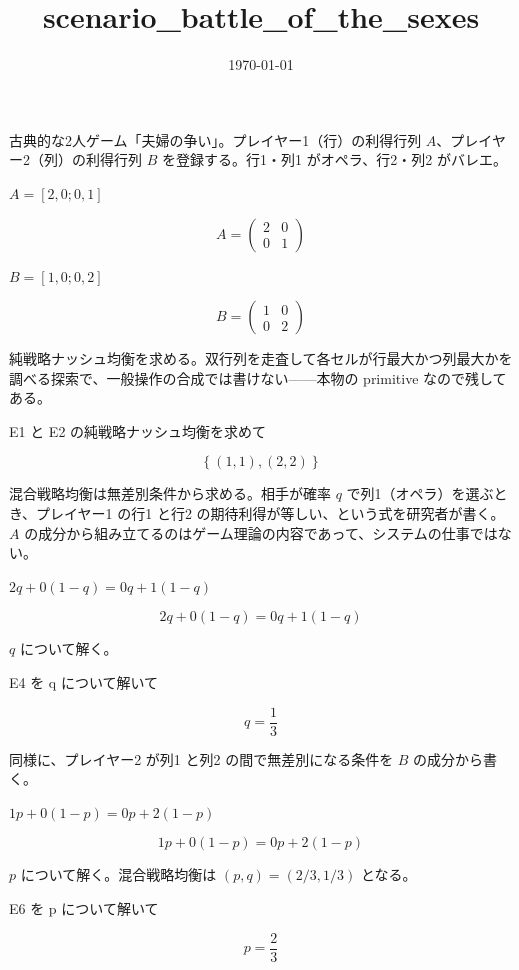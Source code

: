 \documentclass[dvipdfmx,a4paper,11pt]{jsarticle}
\title{scenario\_battle\_of\_the\_sexes}
\date{\today}
\begin{document}
\maketitle

古典的な2人ゲーム「夫婦の争い」。プレイヤー1（行）の利得行列 $A$、プレイヤー2（列）の利得行列 $B$ を登録する。行1・列1 がオペラ、行2・列2 がバレエ。

$A = [2, 0; 0, 1]$

\begin{equation}
  A = \begin{pmatrix} 2 & 0 \\ 0 & 1 \end{pmatrix}
  \label{eq:E1}
\end{equation}

$B = [1, 0; 0, 2]$

\begin{equation}
  B = \begin{pmatrix} 1 & 0 \\ 0 & 2 \end{pmatrix}
  \label{eq:E2}
\end{equation}

純戦略ナッシュ均衡を求める。双行列を走査して各セルが行最大かつ列最大かを調べる探索で、一般操作の合成では書けない——本物の primitive なので残してある。

E1 と E2 の純戦略ナッシュ均衡を求めて

\begin{equation}
  \left\{ \left( 1 , 1 \right) , \left( 2 , 2 \right) \right\}
  \label{eq:E3}
\end{equation}

混合戦略均衡は無差別条件から求める。相手が確率 $q$ で列1（オペラ）を選ぶとき、プレイヤー1 の行1 と行2 の期待利得が等しい、という式を研究者が書く。$A$ の成分から組み立てるのはゲーム理論の内容であって、システムの仕事ではない。

$2 q + 0 (1-q) = 0 q + 1 (1-q)$

\begin{equation}
  2 q + 0 (1-q) = 0 q + 1 (1-q)
  \label{eq:E4}
\end{equation}

$q$ について解く。

E4 を q について解いて

\begin{equation}
  q = \frac{1}{3}
  \label{eq:E5}
\end{equation}

同様に、プレイヤー2 が列1 と列2 の間で無差別になる条件を $B$ の成分から書く。

$1 p + 0 (1-p) = 0 p + 2 (1-p)$

\begin{equation}
  1 p + 0 (1-p) = 0 p + 2 (1-p)
  \label{eq:E6}
\end{equation}

$p$ について解く。混合戦略均衡は $(p,q)=(2/3, 1/3)$ となる。

E6 を p について解いて

\begin{equation}
  p = \frac{2}{3}
  \label{eq:E7}
\end{equation}
\end{document}
